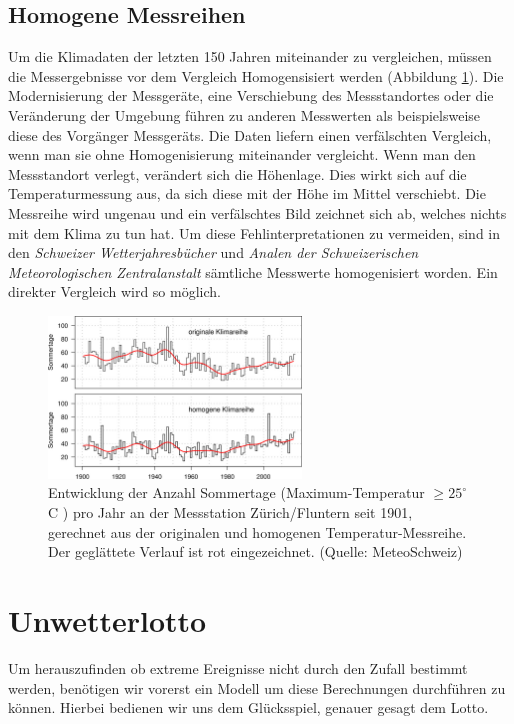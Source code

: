 \begin{refsection}
\subsection{Homogene Messreihen}
Um die Klimadaten der letzten 150 Jahren miteinander zu vergleichen, müssen die Messergebnisse vor dem Vergleich Homogensisiert werden (Abbildung \ref{Homogen}). Die Modernisierung der Messgeräte,  eine Verschiebung des Messstandortes oder die Veränderung der Umgebung führen zu anderen Messwerten als beispielsweise diese des Vorgänger Messgeräts. Die Daten liefern einen verfälschten Vergleich, wenn man sie ohne Homogenisierung miteinander vergleicht.
Wenn man den Messstandort verlegt, verändert sich die Höhenlage. Dies wirkt sich auf die Temperaturmessung aus, da sich diese mit der Höhe im Mittel verschiebt. Die Messreihe wird ungenau und ein verfälschtes Bild zeichnet sich ab, welches nichts mit dem Klima zu tun hat.
Um diese Fehlinterpretationen zu vermeiden, sind in den \textit{Schweizer Wetterjahresbücher} und \textit{Analen der Schweizerischen Meteorologischen Zentralanstalt} sämtliche Messwerte homogenisiert worden. Ein direkter Vergleich wird so möglich.

\begin{figure}[htbp]
\centering
\includegraphics[width=0.6\textwidth]{extrem/Homogen.jpg}
\caption{Entwicklung der Anzahl Sommertage (Maximum-Temperatur $\ge 25^{\circ}$C ) pro Jahr an der Messstation Zürich/Fluntern seit 1901, gerechnet aus der originalen und homogenen Temperatur-Messreihe. Der geglättete Verlauf ist rot eingezeichnet. (Quelle: MeteoSchweiz)}
\label{Homogen}
\end{figure}


\section{Unwetterlotto}
Um herauszufinden ob extreme Ereignisse nicht durch den Zufall bestimmt werden, benötigen wir vorerst ein Modell um diese Berechnungen durchführen zu können.
Hierbei bedienen wir uns dem Glücksspiel, genauer gesagt dem Lotto.


\end{refsection}
